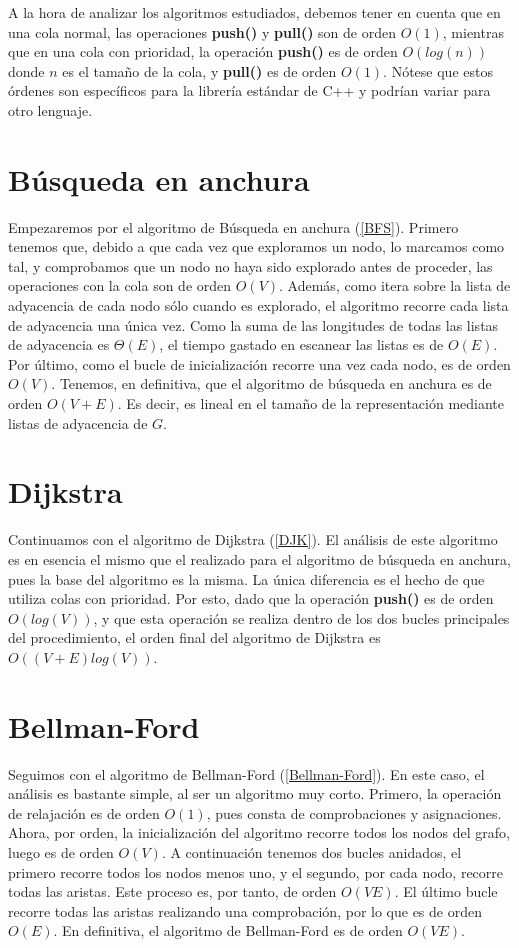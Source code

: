 A la hora de analizar los algoritmos estudiados, debemos tener en cuenta que en una cola normal, las operaciones \textbf{push()} y \textbf{pull()} son de orden $O(1)$, mientras que en una cola con prioridad, la operación \textbf{push()} es de orden $O(log(n))$ donde $n$ es el tamaño de la cola, y \textbf{pull()} es de orden $O(1)$. Nótese que estos órdenes son específicos para la librería estándar de C++ y podrían variar para otro lenguaje.

\section{Búsqueda en anchura}

Empezaremos por el algoritmo de Búsqueda en anchura (\autoref{BFS}). Primero tenemos que, debido a que cada vez que exploramos un nodo, lo marcamos como tal, y comprobamos que un nodo no haya sido explorado antes de proceder, las operaciones con la cola son de orden $O(V)$. Además, como itera sobre la lista de adyacencia de cada nodo sólo cuando es explorado, el algoritmo recorre cada lista de adyacencia una única vez. Como la suma de las longitudes de todas las listas de adyacencia es $\Theta(E)$, el tiempo gastado en escanear las listas es de $O(E)$. Por último, como el bucle de inicialización recorre una vez cada nodo, es de orden $O(V)$. Tenemos, en definitiva, que el algoritmo de búsqueda en anchura es de orden $O(V+E)$. Es decir, es lineal en el tamaño de la representación mediante listas de adyacencia de $G$.

\section{Dijkstra}

Continuamos con el algoritmo de Dijkstra (\autoref{DJK}). El análisis de este algoritmo es en esencia el mismo que el realizado para el algoritmo de búsqueda en anchura, pues la base del algoritmo es la misma. La única diferencia es el hecho de que utiliza colas con prioridad. Por esto, dado que la operación \textbf{push()} es de orden $O(log(V))$, y que esta operación se realiza dentro de los dos bucles principales del procedimiento, el orden final del algoritmo de Dijkstra es $O((V+E)log(V))$.

\section{Bellman-Ford}

Seguimos con el algoritmo de Bellman-Ford (\autoref{Bellman-Ford}). En este caso, el análisis es bastante simple, al ser un algoritmo muy corto. Primero, la operación de relajación es de orden $O(1)$, pues consta de comprobaciones y asignaciones. Ahora, por orden, la inicialización del algoritmo recorre todos los nodos del grafo, luego es de orden $O(V)$. A continuación tenemos dos bucles anidados, el primero recorre todos los nodos menos uno, y el segundo, por cada nodo, recorre todas las aristas. Este proceso es, por tanto, de orden $O(VE)$. El último bucle recorre todas las aristas realizando una comprobación, por lo que es de orden $O(E)$. En definitiva, el algoritmo de Bellman-Ford es de orden $O(VE)$.

